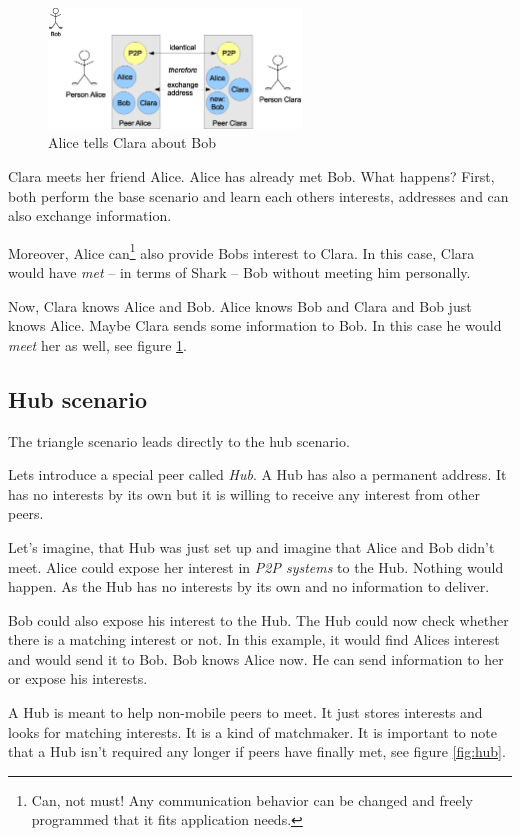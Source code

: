 \begin{figure}[t]
\centering
\includegraphics[width=0.60\textwidth]{triangle.eps}
\caption{Alice tells Clara about Bob}
\label{fig:triangle}
\end{figure}

Clara meets her friend Alice. Alice has already met Bob. What happens? First, both perform the base scenario and learn each others interests, addresses and can also exchange information.

Moreover, Alice can\footnote{Can, not must! Any communication behavior can be changed and freely programmed that it fits application needs.} also provide Bobs interest to Clara. In this case, Clara would have {\it met} -- in terms of Shark -- Bob without meeting him personally.

Now, Clara knows Alice and Bob. Alice knows Bob and Clara and Bob just knows Alice. Maybe Clara sends some information to Bob. In this case he would {\it meet} her as well, see figure \ref{fig:triangle}.

\subsection{Hub scenario}
The triangle scenario leads directly to the hub scenario.

Lets introduce a special peer called {\it Hub}. A Hub has also a permanent address. It has no interests by its own but it is willing to receive any interest from other peers.

Let's imagine, that Hub was just set up and imagine that Alice and Bob didn't meet. Alice could expose her interest in {\it P2P systems} to the Hub. Nothing would happen. As the Hub has no interests by its own and no information to deliver.

Bob could also expose his interest to the Hub. The Hub could now check whether there is a matching interest or not. In this example, it would find Alices interest and would send it to Bob. Bob knows Alice now. He can send information to her or expose his interests.

A Hub is meant to help non-mobile peers to meet. It just stores interests and looks for matching interests. It is a kind of matchmaker. It is important to note that a Hub isn't required any longer if peers have finally met, see figure \ref{fig:hub}.

